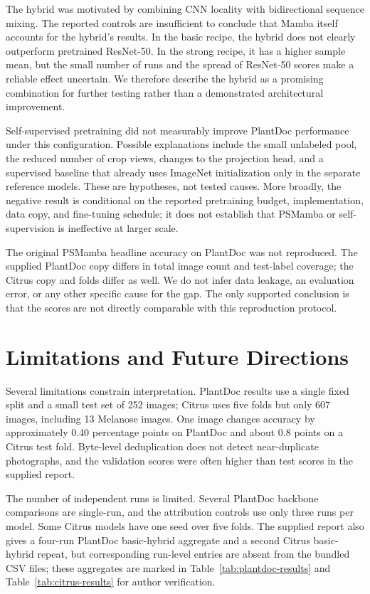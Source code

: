 \documentclass[conference]{IEEEtran}
\begin{document}
The hybrid was motivated by combining CNN locality with bidirectional sequence mixing. The reported controls are insufficient to conclude that Mamba itself accounts for the hybrid's results. In the basic recipe, the hybrid does not clearly outperform pretrained ResNet-50. In the strong recipe, it has a higher sample mean, but the small number of runs and the spread of ResNet-50 scores make a reliable effect uncertain. We therefore describe the hybrid as a promising combination for further testing rather than a demonstrated architectural improvement.

Self-supervised pretraining did not measurably improve PlantDoc performance under this configuration. Possible explanations include the small unlabeled pool, the reduced number of crop views, changes to the projection head, and a supervised baseline that already uses ImageNet initialization only in the separate reference models. These are hypotheses, not tested causes. More broadly, the negative result is conditional on the reported pretraining budget, implementation, data copy, and fine-tuning schedule; it does not establish that PSMamba or self-supervision is ineffective at larger scale.

The original PSMamba headline accuracy on PlantDoc was not reproduced. The supplied PlantDoc copy differs in total image count and test-label coverage; the Citrus copy and folds differ as well. We do not infer data leakage, an evaluation error, or any other specific cause for the gap. The only supported conclusion is that the scores are not directly comparable with this reproduction protocol.

\section{Limitations and Future Directions}
Several limitations constrain interpretation. PlantDoc results use a single fixed split and a small test set of 252 images; Citrus uses five folds but only 607 images, including 13 Melanose images. One image changes accuracy by approximately 0.40 percentage points on PlantDoc and about 0.8 points on a Citrus test fold. Byte-level deduplication does not detect near-duplicate photographs, and the validation scores were often higher than test scores in the supplied report.

The number of independent runs is limited. Several PlantDoc backbone comparisons are single-run, and the attribution controls use only three runs per model. Some Citrus models have one seed over five folds. The supplied report also gives a four-run PlantDoc basic-hybrid aggregate and a second Citrus basic-hybrid repeat, but corresponding run-level entries are absent from the bundled CSV files; these aggregates are marked in Table~\ref{tab:plantdoc-results} and Table~\ref{tab:citrus-results} for author verification.
\end{document}
